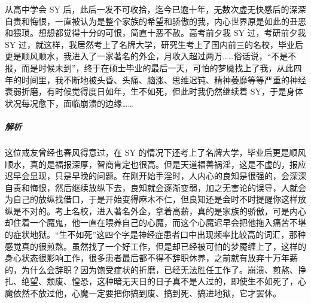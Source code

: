 \begin{case}[神经衰弱]
    从高中学会 SY 后，此后一发不可收拾，迄今已逾十年，无数次虚无快感后的深深自责和悔恨，一直被认为是整个家族的希望和骄傲的我，内心世界原是如此的丑恶和猥琐。想想都觉得十分的可恨，简直十恶不赦。高考前夕我 SY 过，考研前夕我 SY 过，就这样，我居然考上了名牌大学，研究生考上了国内前三的名校，毕业后更是顺风顺水，我进入了一家著名的外企，月收入超过两万……俗话说，“不是不报，而是时候未到”，终于在硕士毕业的最后一天，可怕的梦魇找上了我，从此四年的时间里，我不断地被头昏、头痛、脑涨、思维迟钝、精神萎靡等等严重的神经衰弱折磨，有时候觉得度日如年，生不如死，但此时我仍然继续着 SY，于是身体状况每况愈下，面临崩溃的边缘……
    \subparagraph{解析} 这位戒友曾经也春风得意过，在 SY 的情况下还考上了名牌大学，毕业后更是顺风顺水，真的是福报深厚，智商肯定也很高。但是天道福善祸淫，这是不虚的，报应迟早会显现，只是早晚的问题。在刚开始手淫时，人内心的良知是很强的，会深深自责和悔恨，然后继续放纵下去，良知就会逐渐变弱，加之无害论的误导，人就会为自己的放纵找借口，于是开始变得麻木不仁，但良知还是会时不时提醒你这样放纵是不对的。考上名校，进入著名外企，拿着高薪，真的是家族的骄傲，可是内心却住着一个魔鬼，他一直在喂养自己的心魔，而这个心魔迟早会把他拖入痛苦不堪的症状地狱。“生不如死”这四个字是神经症患者口中出现频率比较高的词汇，那种感觉真的很煎熬。虽然找了一个好工作，但是却已经被可怕的梦魇缠上了，这样的身心状态很影响工作，很多患者最后都不得不辞职休养，之前就有放弃十万年薪的，为什么会辞职？因为饱受症状的折磨，已经无法胜任工作了。崩溃、煎熬、挣扎、绝望、颓废、惶恐，这种暗无天日的日子真不是人过的，即使生不如死了，心魔依然不放过他，心魔一定要把你搞到废、搞到死、搞进地狱，它才罢休。
\end{case}

